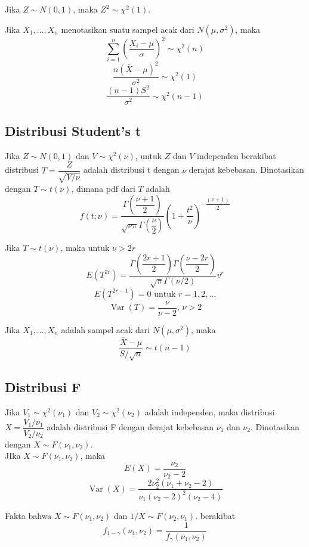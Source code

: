 \documentclass[a4paper,extrafontsizes, 9pt]{memoir}
\DeclareMathOperator{\Var}{Var}
\begin{document}
\begin{multicols}{3}
                Jika $Z\sim N(0,1)$, maka $Z^2\sim\chi^2(1)$.

                Jika $X_1,\dots,X_n$ menotasikan suatu sampel acak dari $N(\mu,\sigma^2)$, maka
                \[\sum_{i=1}^{n}\left(\dfrac{X_i-\mu}{\sigma}\right)^2\sim\chi^2(n)\]
                \[\frac{n(\bar{X}-\mu)^2}{\sigma^2}\sim\chi^2(1)\]
                \[\dfrac{(n-1)S^2}{\sigma^2}\sim\chi^2(n-1)\]
            \subsection*{\small Distribusi Student's t}
                Jika $Z\sim N(0,1)$ dan $V\sim\chi^2(\nu)$, untuk $Z$ dan $V$ independen berakibat distribusi $\displaystyle T=\dfrac{Z}{\sqrt{V/\nu}}$ adalah distribusi t dengan $\nu$ derajat kebebasan. Dinotasikan dengan $T\sim t(\nu)$, dimana pdf dari $T$ adalah
                \[f(t;\nu)=\dfrac{\Gamma\left(\dfrac{\nu+1}{2}\right)}{\sqrt{\nu\pi}\Gamma\left(\dfrac{\nu}{2}\right)}\left(1+\dfrac{t^2}{\nu}\right)^{-\dfrac{(\nu+1)}{2}}\]

                Jika $T\sim t(\nu)$, maka untuk $\nu>2r$
                \[E(T^{2r})=\dfrac{\Gamma\left(\dfrac{2r+1}{2}\right)\Gamma\left(\dfrac{\nu-2r}{2}\right)}{\sqrt{\pi}\Gamma(\nu/2)}v^r\]
                \[E(T^{2r-1})=0 \text{ untuk } r=1,2,\dots\]
                \[\Var(T)=\dfrac{\nu}{\nu-2},\,\nu>2\]

                Jika $X_1,\dots,X_n$ adalah sampel acak dari $N(\mu,\sigma^2)$, maka
                \[\dfrac{\bar{X}-\mu}{S/\sqrt{n}}\sim t(n-1)\]

            \subsection*{\small Distribusi F}
                Jika $V_1\sim\chi^2(\nu_1)$ dan $V_2\sim\chi^2(\nu_2)$ adalah independen, maka distribusi $X=\dfrac{V_1/\nu_1}{V_2/\nu_2}$ adalah distribusi F dengan derajat kebebasan $\nu_1$ dan $\nu_2$. Dinotasikan dengan $X\sim F(\nu_1,\nu_2)$.\\

                JIka $X\sim F(\nu_1,\nu_2)$, maka
                \[E(X)=\dfrac{\nu_2}{\nu_2-2}\]
                \[\Var(X)=\dfrac{2\nu_2^2(\nu_1+\nu_2-2)}{\nu_1(\nu_2-2)^2(\nu_2-4)}\]

                Fakta bahwa $X\sim F(\nu_1,\nu_2)$ dan $1/X\sim F(\nu_2,\nu_1)$. berakibat 
                \[f_{1-\gamma}(\nu_1,\nu_2)=\dfrac{1}{f_{\gamma}(\nu_1,\nu_2)}\]


\end{multicols}
\end{document}
